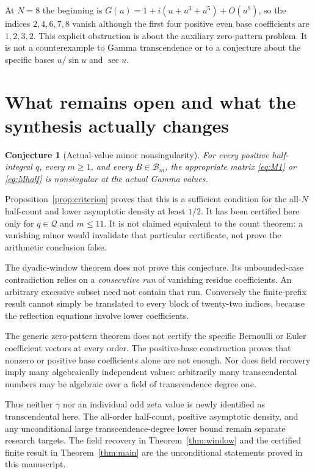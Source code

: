 \documentclass[11pt,a4paper]{article}
\newtheorem{conjecture}[theorem]{Conjecture}
\theoremstyle{definition}\newtheorem{definition}[theorem]{Definition}
\theoremstyle{remark}\newtheorem{remark}[theorem]{Remark}
\begin{document}
At $N=8$ the beginning is $G(u)=1+i(u+u^3+u^5)+O(u^9)$, so the indices $2,4,6,7,8$ vanish although the first four positive even base coefficients are $1,2,3,2$. This explicit obstruction is about the auxiliary zero-pattern problem. It is not a counterexample to Gamma transcendence or to a conjecture about the specific bases $u/\sin u$ and $\sec u$.


\section{What remains open and what the synthesis actually changes}\label{sec:open}
\begin{conjecture}[Actual-value minor nonsingularity]\label{conj:jac}
For every positive half-integral $q$, every $m\ge1$, and every $B\in\mathcal B_m$, the appropriate matrix \eqref{eq:M1} or \eqref{eq:Mhalf} is nonsingular at the actual Gamma values.
\end{conjecture}
Proposition~\ref{prop:criterion} proves that this is a sufficient condition for the all-$N$ half-count and lower asymptotic density at least $1/2$. It has been certified here only for $q\in\mathcal Q$ and $m\le11$. It is not claimed equivalent to the count theorem: a vanishing minor would invalidate that particular certificate, not prove the arithmetic conclusion false.

The dyadic-window theorem does not prove this conjecture. Its unbounded-case contradiction relies on a \emph{consecutive run} of vanishing residue coefficients. An arbitrary excessive subset need not contain that run. Conversely the finite-prefix result cannot simply be translated to every block of twenty-two indices, because the reflection equations involve lower coefficients.

The generic zero-pattern theorem does not certify the specific Bernoulli or Euler coefficient vectors at every order. The positive-base construction proves that nonzero or positive base coefficients alone are not enough. Nor does field recovery imply many algebraically independent values: arbitrarily many transcendental numbers may be algebraic over a field of transcendence degree one.

Thus neither $\gamma$ nor an individual odd zeta value is newly identified as transcendental here. The all-order half-count, positive asymptotic density, and any unconditional large transcendence-degree lower bound remain separate research targets. The field recovery in Theorem~\ref{thm:window} and the certified finite result in Theorem~\ref{thm:main} are the unconditional statements proved in this manuscript.
\end{document}
